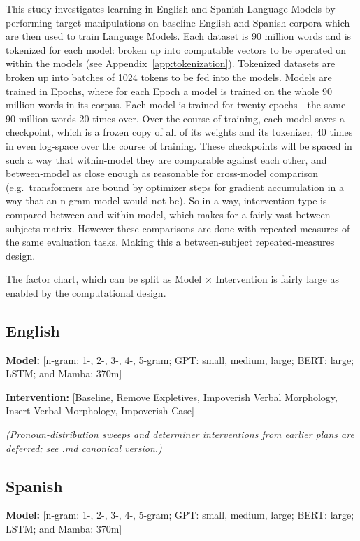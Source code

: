 \documentclass[12pt]{article}
\begin{document}
This study investigates learning in English and Spanish Language Models by performing target manipulations on baseline English and Spanish corpora which are then used to train Language Models. Each dataset is 90 million words and is tokenized for each model: broken up into computable vectors to be operated on within the models (see Appendix~\ref{app:tokenization}). Tokenized datasets are broken up into batches of 1024 tokens to be fed into the models. Models are trained in Epochs, where for each Epoch a model is trained on the whole 90 million words in its corpus. Each model is trained for twenty epochs---the same 90 million words 20 times over. Over the course of training, each model saves a checkpoint, which is a frozen copy of all of its weights and its tokenizer, 40 times in even log-space over the course of training. These checkpoints will be spaced in such a way that within-model they are comparable against each other, and between-model as close enough as reasonable for cross-model comparison (e.g.\ transformers are bound by optimizer steps for gradient accumulation in a way that an n-gram model would not be). So in a way, intervention-type is compared between and within-model, which makes for a fairly vast between-subjects matrix. However these comparisons are done with repeated-measures of the same evaluation tasks. Making this a between-subject repeated-measures design.

The factor chart, which can be split as Model $\times$ Intervention is fairly large as enabled by the computational design.

\subsection{English}

\textbf{Model:} [n-gram: 1-, 2-, 3-, 4-, 5-gram; GPT: small, medium, large; BERT: large; LSTM; and Mamba: 370m]

\textbf{Intervention:} [Baseline, Remove Expletives, Impoverish Verbal Morphology, Insert Verbal Morphology, Impoverish Case]

\textit{(Pronoun-distribution sweeps and determiner interventions from earlier plans are deferred; see .md canonical version.)}

\subsection{Spanish}

\textbf{Model:} [n-gram: 1-, 2-, 3-, 4-, 5-gram; GPT: small, medium, large; BERT: large; LSTM; and Mamba: 370m]
\end{document}
